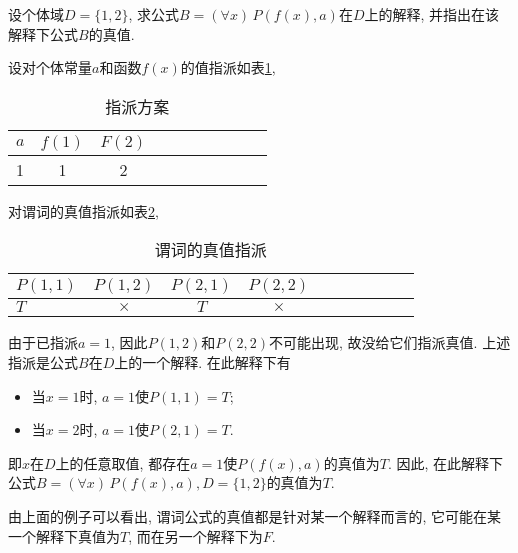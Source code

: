 \begin{example}
    设个体域$D=\{1, 2\}$, 求公式$B=(\forall x)\,P(f(x), a)$在$D$上的解释, 并指出在该解释下公式$B$的真值.
\end{example}
\begin{result}
设对个体常量$a$和函数$f(x)$的值指派如表\ref{AI_table2019113003},
\begin{table}[H]
\caption{指派方案}
\vspace{-0.6cm}
\begin{center}
\begin{tabular} {lccccccccc}
  \hline
$a$	&$f(1)$&$	F(2)$\\
\hline
1&	1	&2\\
\hline
\end{tabular}
\end{center}
\label{AI_table2019113003}
\end{table}
对谓词的真值指派如表\ref{AI_table2019113004},
\begin{table}[H]
\caption{谓词的真值指派}
\vspace{-0.6cm}
\begin{center}
\begin{tabular} {lccccccccc}
\hline
     $P(1,1)$&	  $P(1,2)$	&   $P(2,1)$&	   $P(2,2)$\\
\hline
     $T$	&   $\times$	&   $T$	&   $\times$	\\
\hline
\end{tabular}
\end{center}
\label{AI_table2019113004}
\end{table}
由于已指派$a=1$, 因此$P(1,2)$和$P(2,2)$不可能出现, 故没给它们指派真值.
上述指派是公式$B$在$D$上的一个解释. 在此解释下有
\begin{itemize}
\item 当$x=1$时, $a=1$使$P(1,1)=T$;
\item 当$x=2$时, $a=1$使$P(2,1)=T$.
\end{itemize}
即$x$在$D$上的任意取值, 都存在$a=1$使$P(f(x), a)$的真值为$T$. 因此, 在此解释下公式$B=(\forall x)\,P(f(x), a), D=\{1, 2\}$的真值为$T$.
\end{result}
\begin{remark}
    由上面的例子可以看出, 谓词公式的真值都是针对某一个解释而言的, 它可能在某一个解释下真值为$T$, 而在另一个解释下为$F$.
\end{remark}
